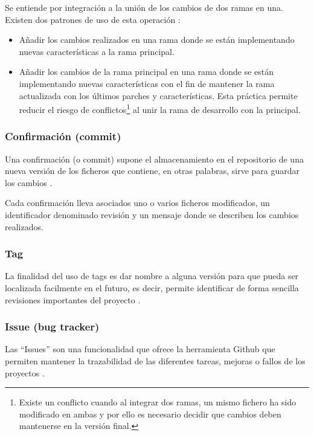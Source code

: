 Se entiende por integración a la unión de los cambios de dos ramas en una. Existen dos patrones de uso de esta operación \cite{sbf5:git3}:

\begin{itemize}
	\item Añadir los cambios realizados en una rama donde se están implementando nuevas características a la rama principal.
	\item Añadir los cambios de la rama principal en una rama donde se están implementando nuevas características con el fin de mantener la rama actualizada con los últimos parches y características. Esta práctica permite reducir el riesgo de conflictos\footnote{Existe un conflicto cuando al integrar dos ramas, un mismo fichero ha sido modificado en ambas y por ello es necesario decidir que cambios deben mantenerse en la versión final.} al unir la rama de desarrollo con la principal.
\end{itemize}

\subsubsection{Confirmación (commit)}

Una confirmación (o commit) supone el almacenamiento en el repositorio de una nueva versión de los ficheros que contiene, en otras palabras, sirve para guardar los cambios \cite{Chacon:2014:PG:2695634}.

Cada confirmación lleva asociados uno o varios ficheros modificados, un identificador denominado revisión y un mensaje donde se describen los cambios realizados.

\subsubsection{Tag}

La finalidad del uso de tags es dar nombre a alguna versión para que pueda ser localizada facilmente en el futuro, es decir, permite identificar de forma sencilla revisiones importantes del proyecto \cite{wiki:002}.

\subsubsection{Issue (bug tracker)}

Las ``Issues'' son una funcionalidad que ofrece la herramienta Github que permiten mantener la trazabilidad de las diferentes tareas, mejoras o fallos de los proyectos \cite{github:issues}.

